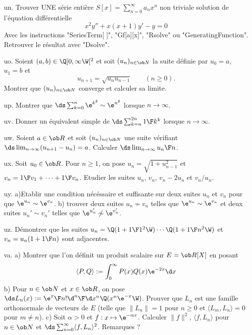 \exo [Level=2,Fight=2,Learn=2,Field=\EquationsDifférentielles,Type=\Maple,Origin=] un. 
Trouver UNE série entière $S[x]=\sum_{n=0}^\infty a_nx^n$ non triviale
solution de l'équation différentielle 
$$
x^2y''+x(x+1)y'-y=0
$$
Avec les instructions "SeriesTerm[  ]", "Gf[a][x]", "Rsolve" ou "GeneratingFunction". \pn
Retrouver le résultat avec "Dsolve". 

\exo [Level=1,Fight=0,Learn=0,Type=\Exercices,Field=\Suites,Origin=] uo. 
Soient $(a,b)\in\Q]0,\infty\W[^2$ et soit $(u_n)_{n\in\ob N}$ la suite définie par $u_0=a$, $u_1=b$ et 
$$
u_{n+1}=\sqrt{u_nu_{n-1}}\qquad(n\ge0).
$$
Montrer que $(u_n)_{n\in\ob N}$ converge et calculer sa limite. 

\exo [Level=1,Fight=0,Learn=0,Type=\Exercices,Field=\DéveloppementsLimités,Origin=] up. 
Montrer que $\ds\sum_{k=0}^n\e^{k^2}\sim\e^{n^2}$ lorsque $n\to\infty$. 

\exo [Level=1,Fight=0,Learn=0,Type=\Exercices,Field=\DéveloppementsLimités,Origin=] uv. Donner un équivalent simple de $\ds\sum_{k=n}^{2n}{1\F k^k}$ lorsque $n\to\infty$. 
 
\exo [Level=1,Fight=0,Learn=0,Type=\Exercices,Field=\DéveloppementsLimités,Origin=] uw. 
Soient $a\in\ob R$ et soit $(u_n)_{n\in\ob N}$ une suite vérifiant 
$\ds\lim_{n\to\infty}(u_{n+1}-u_n)=a$. Calculer $\ds\lim_{n\to\infty}{u_n\F n}$. 

\exo [Level=2,Fight=0,Learn=0,Type=\Exercices,Field=\SériesNumériques,Origin=] ux. 
Soit $u_0\in\ob R$. Pour $n\ge1$, on pose $u_n=\sqrt{1+u_{n-1}^2}$ 
et $v_n={1\F v_1}+\cdots+{1\F v_n}$. Etudier les suites $u_n$, $v_n$, $v_n-2u_n$ et $v_n/u_n$. 

\exo [Level=1,Fight=0,Learn=0,Type=\Exercices,Field=\Suites,Origin=] uy. 
a)Etablir une condition nécéssaire et suffisante 
sur deux suites $u_n$ et $v_n$ pour que $\e^{u_n}\sim\e^{v_n}$. 
\pn
b) trouver deux suites $u_n\not\sim v_n$ telles que $\e^{u_n}\sim\e^{v_n}$ et deux suites $u_n'\sim v_n'$ 
telles que $\e^{u_n'}\not\sim\e^{v_n'}$. 

\exo [Level=1,Fight=0,Learn=0,Type=\Exercices,Field=\Suites,Origin=] uz. 
Démontrer que les suites $u_n=\Q(1+{1\F1^2}\W)\cdots\Q(1+{1\F n^2}\W)$ 
et $v_n=u_n(1+{1\F n})$ sont adjacentes. 

\exo [Level=2,Fight=2,Learn=2,Field=\Orthonormalisation,Type=\Colles,Origin=] va. 
a) Montrer que l'on définit un produit scalaire sur $E=\ob R[X]$ en posant 
$$
\langle P,Q\rangle:=\int_0^\infty P(x)Q(x)\e^{-2x}\d x
$$ 
b) Pour $n\in\ob N$ et $x\in\ob R$, on pose $\ds L_n(x):={\e^x\F n!}{\d ^n\F\d x^n}\Q(x^n\e^{-x}\W)$. 
Prouver que $L_n$ est une famille orthonormale de vecteurs de $E$ (telle que $\|L_n\|=1$ pour $n\ge0$ 
et $\langle L_m, L_n\rangle=0$ pour $m\neq n$). \pn
c) Soit $\alpha>0$ et $f:x\mapsto \e^{-\alpha x}$. Calculer $\|f\|^2$, $\langle f,L_n\rangle$ 
pour $n\in\ob N$ et $\ds\sum_{n=0}^\infty\langle f,L_n\rangle^2$. Remarques ?

